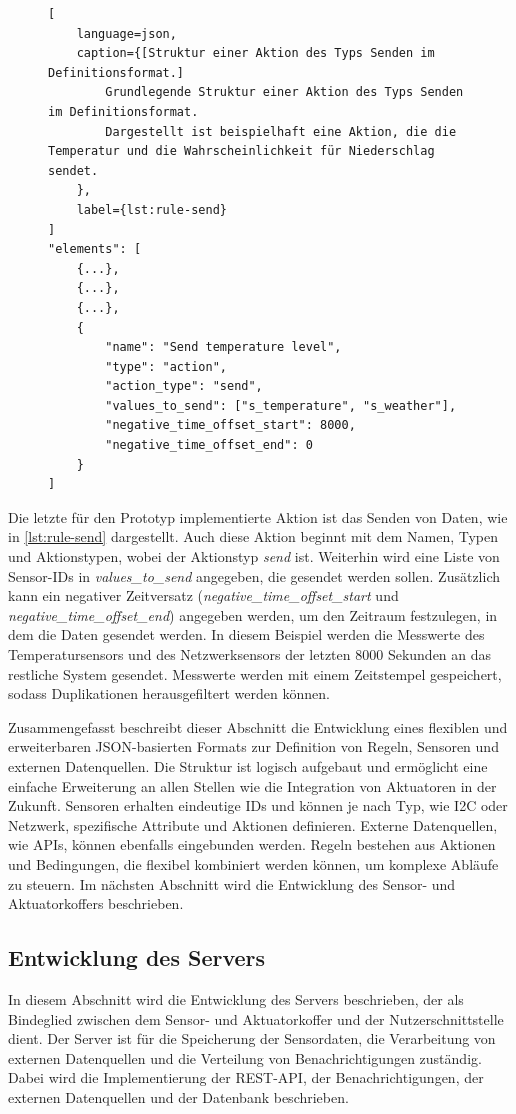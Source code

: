 \begin{figure}[!htb]
\begin{lstlisting}[
	language=json,
	caption={[Struktur einer Aktion des Typs Senden im Definitionsformat.]
		Grundlegende Struktur einer Aktion des Typs Senden im Definitionsformat.
		Dargestellt ist beispielhaft eine Aktion, die die Temperatur und die Wahrscheinlichkeit für Niederschlag sendet.
	},
	label={lst:rule-send}
]
"elements": [
	{...},
	{...},
	{...},
	{
		"name": "Send temperature level",
		"type": "action",
		"action_type": "send",
		"values_to_send": ["s_temperature", "s_weather"],
		"negative_time_offset_start": 8000,
		"negative_time_offset_end": 0
	}
]
\end{lstlisting}
\end{figure}

Die letzte für den Prototyp implementierte Aktion ist das Senden von Daten, wie in \cref{lst:rule-send} dargestellt.
Auch diese Aktion beginnt mit dem Namen, Typen und Aktionstypen, wobei der Aktionstyp \emph{send} ist.
Weiterhin wird eine Liste von Sensor-IDs in \emph{values\_to\_send} angegeben, die gesendet werden sollen.
Zusätzlich kann ein negativer Zeitversatz (\emph{negative\_time\_offset\_start} und \emph{negative\_time\_offset\_end}) angegeben werden, um den Zeitraum festzulegen, in dem die Daten gesendet werden.
In diesem Beispiel werden die Messwerte des Temperatursensors und des Netzwerksensors der letzten 8000 Sekunden an das restliche System gesendet.
Messwerte werden mit einem Zeitstempel gespeichert, sodass Duplikationen herausgefiltert werden können.

Zusammengefasst beschreibt dieser Abschnitt die Entwicklung eines flexiblen und erweiterbaren JSON-basierten Formats zur Definition von Regeln, Sensoren und externen Datenquellen.
Die Struktur ist logisch aufgebaut und ermöglicht eine einfache Erweiterung an allen Stellen wie die Integration von Aktuatoren in der Zukunft.
Sensoren erhalten eindeutige IDs und können je nach Typ, wie I2C oder Netzwerk, spezifische Attribute und Aktionen definieren.
Externe Datenquellen, wie APIs, können ebenfalls eingebunden werden.
Regeln bestehen aus Aktionen und Bedingungen, die flexibel kombiniert werden können, um komplexe Abläufe zu steuern.
Im nächsten Abschnitt wird die Entwicklung des Sensor- und Aktuatorkoffers beschrieben.


\subsection{Entwicklung des Servers}
In diesem Abschnitt wird die Entwicklung des Servers beschrieben, der als Bindeglied zwischen dem Sensor- und Aktuatorkoffer und der Nutzerschnittstelle dient.
Der Server ist für die Speicherung der Sensordaten, die Verarbeitung von externen Datenquellen und die Verteilung von Benachrichtigungen zuständig.
Dabei wird die Implementierung der REST-API, der Benachrichtigungen, der externen Datenquellen und der Datenbank beschrieben.

